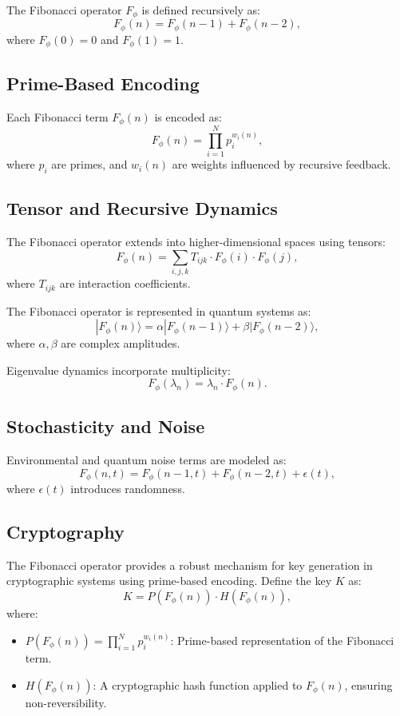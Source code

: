 \documentclass{article}
\theoremstyle{plain}
\begin{document}
\begin{itemize}
\begin{itemize}
\begin{definition}
The Fibonacci operator \( F_\phi \) is defined recursively as:
\[
F_\phi(n) = F_\phi(n-1) + F_\phi(n-2),
\]
where \( F_\phi(0) = 0 \) and \( F_\phi(1) = 1 \).
\end{definition}

\subsection{Prime-Based Encoding}
Each Fibonacci term \( F_\phi(n) \) is encoded as:
\[
F_\phi(n) = \prod_{i=1}^{N} p_i^{w_i(n)},
\]
where \( p_i \) are primes, and \( w_i(n) \) are weights influenced by recursive feedback.

\subsection{Tensor and Recursive Dynamics}
The Fibonacci operator extends into higher-dimensional spaces using tensors:
\[
F_\phi(n) = \sum_{i,j,k} T_{ijk} \cdot F_\phi(i) \cdot F_\phi(j),
\]
where \( T_{ijk} \) are interaction coefficients.

The Fibonacci operator is represented in quantum systems as:
\[
|F_\phi(n)\rangle = \alpha |F_\phi(n-1)\rangle + \beta |F_\phi(n-2)\rangle,
\]
where \( \alpha, \beta \) are complex amplitudes.

Eigenvalue dynamics incorporate multiplicity:
\[
F_\phi(\lambda_n) = \lambda_n \cdot F_\phi(n).
\]

\subsection{Stochasticity and Noise}
Environmental and quantum noise terms are modeled as:
\[
F_\phi(n, t) = F_\phi(n-1, t) + F_\phi(n-2, t) + \epsilon(t),
\]
where \( \epsilon(t) \) introduces randomness.

\subsection{Cryptography}
The Fibonacci operator provides a robust mechanism for key generation in cryptographic systems using prime-based encoding. Define the key \( K \) as:
\[
K = P(F_\phi(n)) \cdot H(F_\phi(n)),
\]
where:
\begin{itemize}
    \item \( P(F_\phi(n)) = \prod_{i=1}^{N} p_i^{w_i(n)} \): Prime-based representation of the Fibonacci term.
    \item \( H(F_\phi(n)) \): A cryptographic hash function applied to \( F_\phi(n) \), ensuring non-reversibility.
\end{itemize}


\end{itemize}
\end{itemize}
\end{document}
